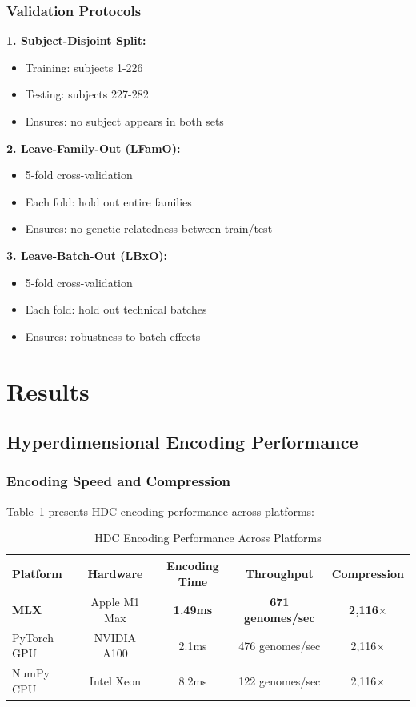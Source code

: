 \documentclass[11pt,a4paper]{article}
\begin{document}
\subsubsection{Validation Protocols}

\textbf{1. Subject-Disjoint Split:}
\begin{itemize}
    \item Training: subjects 1-226
    \item Testing: subjects 227-282
    \item Ensures: no subject appears in both sets
\end{itemize}

\textbf{2. Leave-Family-Out (LFamO):}
\begin{itemize}
    \item 5-fold cross-validation
    \item Each fold: hold out entire families
    \item Ensures: no genetic relatedness between train/test
\end{itemize}

\textbf{3. Leave-Batch-Out (LBxO):}
\begin{itemize}
    \item 5-fold cross-validation
    \item Each fold: hold out technical batches
    \item Ensures: robustness to batch effects
\end{itemize}

\section{Results}

\subsection{Hyperdimensional Encoding Performance}

\subsubsection{Encoding Speed and Compression}

Table~\ref{tab:hdc_performance} presents HDC encoding performance across platforms:

\begin{table}[H]
\centering
\caption{HDC Encoding Performance Across Platforms}
\label{tab:hdc_performance}
\begin{tabular}{lcccc}
\toprule
\textbf{Platform} & \textbf{Hardware} & \textbf{Encoding Time} & \textbf{Throughput} & \textbf{Compression} \\
\midrule
\textbf{MLX} & Apple M1 Max & \textbf{1.49ms} & \textbf{671 genomes/sec} & \textbf{2,116$\times$} \\
PyTorch GPU & NVIDIA A100 & 2.1ms & 476 genomes/sec & 2,116$\times$ \\
NumPy CPU & Intel Xeon & 8.2ms & 122 genomes/sec & 2,116$\times$ \\
\bottomrule
\end{tabular}
\end{table}
\end{document}
